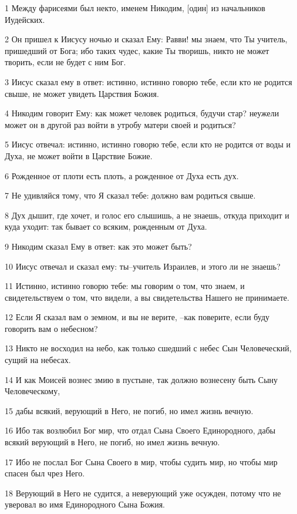 \par 1 Между фарисеями был некто, именем Никодим, [один] из начальников Иудейских.
\par 2 Он пришел к Иисусу ночью и сказал Ему: Равви! мы знаем, что Ты учитель, пришедший от Бога; ибо таких чудес, какие Ты творишь, никто не может творить, если не будет с ним Бог.
\par 3 Иисус сказал ему в ответ: истинно, истинно говорю тебе, если кто не родится свыше, не может увидеть Царствия Божия.
\par 4 Никодим говорит Ему: как может человек родиться, будучи стар? неужели может он в другой раз войти в утробу матери своей и родиться?
\par 5 Иисус отвечал: истинно, истинно говорю тебе, если кто не родится от воды и Духа, не может войти в Царствие Божие.
\par 6 Рожденное от плоти есть плоть, а рожденное от Духа есть дух.
\par 7 Не удивляйся тому, что Я сказал тебе: должно вам родиться свыше.
\par 8 Дух дышит, где хочет, и голос его слышишь, а не знаешь, откуда приходит и куда уходит: так бывает со всяким, рожденным от Духа.
\par 9 Никодим сказал Ему в ответ: как это может быть?
\par 10 Иисус отвечал и сказал ему: ты--учитель Израилев, и этого ли не знаешь?
\par 11 Истинно, истинно говорю тебе: мы говорим о том, что знаем, и свидетельствуем о том, что видели, а вы свидетельства Нашего не принимаете.
\par 12 Если Я сказал вам о земном, и вы не верите, --как поверите, если буду говорить вам о небесном?
\par 13 Никто не восходил на небо, как только сшедший с небес Сын Человеческий, сущий на небесах.
\par 14 И как Моисей вознес змию в пустыне, так должно вознесену быть Сыну Человеческому,
\par 15 дабы всякий, верующий в Него, не погиб, но имел жизнь вечную.
\par 16 Ибо так возлюбил Бог мир, что отдал Сына Своего Единородного, дабы всякий верующий в Него, не погиб, но имел жизнь вечную.
\par 17 Ибо не послал Бог Сына Своего в мир, чтобы судить мир, но чтобы мир спасен был чрез Него.
\par 18 Верующий в Него не судится, а неверующий уже осужден, потому что не уверовал во имя Единородного Сына Божия.
